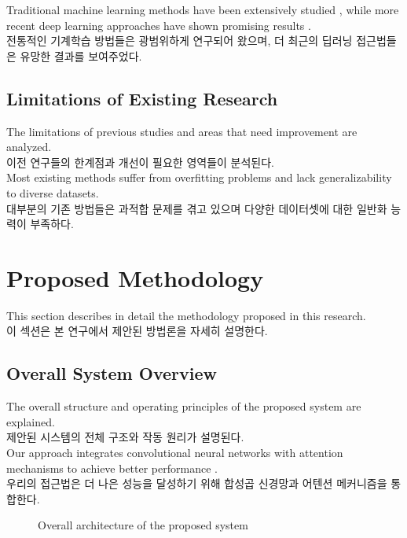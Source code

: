 \documentclass[preprint,12pt]{elsarticle}
\begin{document}
Traditional machine learning methods have been extensively studied \cite{hastie2009elements}, while more recent deep learning approaches have shown promising results \cite{schmidhuber2015deep}. \\
전통적인 기계학습 방법들은 광범위하게 연구되어 왔으며, 더 최근의 딥러닝 접근법들은 유망한 결과를 보여주었다. \\

\subsection{Limitations of Existing Research}
The limitations of previous studies and areas that need improvement are analyzed. \\
이전 연구들의 한계점과 개선이 필요한 영역들이 분석된다. \\

Most existing methods suffer from overfitting problems and lack generalizability to diverse datasets. \\
대부분의 기존 방법들은 과적합 문제를 겪고 있으며 다양한 데이터셋에 대한 일반화 능력이 부족하다. \\

\section{Proposed Methodology}
\label{sec:methodology}

This section describes in detail the methodology proposed in this research. \\
이 섹션은 본 연구에서 제안된 방법론을 자세히 설명한다. \\

\subsection{Overall System Overview}
The overall structure and operating principles of the proposed system are explained. \\
제안된 시스템의 전체 구조와 작동 원리가 설명된다. \\

Our approach integrates convolutional neural networks with attention mechanisms to achieve better performance \cite{vaswani2017attention}. \\
우리의 접근법은 더 나은 성능을 달성하기 위해 합성곱 신경망과 어텐션 메커니즘을 통합한다. \\

\begin{figure}[htbp]
    \centering
    
    \caption{Overall architecture of the proposed system}
    \label{fig:system_overview}
\end{figure}
\end{document}
